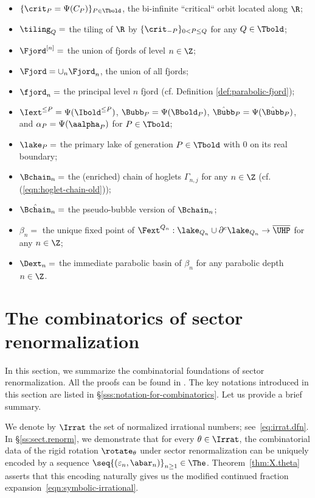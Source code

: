 \documentclass{amsart}
\begin{document}
\begin{itemize}
    \item $\{ \crit_P = \Psi(C_P) \}_{P \in \Tbold}$, the bi-infinite ``critical`` orbit located along $\R$;
    \item $\tiling_Q =$ the tiling of $\R$ by $\{\crit_{-P}\}_{0 < P \leq Q}$ for any $Q \in \Tbold$;
    \item $\Fjord^{[n]} = $ the union of fjords of level $n \in \Z$;
    \item $\Fjord = \cup_n \Fjord_n$, the union of all fjords;
    \item $\fjord_n = $ the principal level $n$ fjord (cf. Definition \ref{def:parabolic-fjord});
    \item $\Iext^{\leq P} = \Psi(\Ibold^{\leq P})$, $\Bubb_P = \Psi(\Bbold_P)$, $\hat{\Bubb}_P = \Psi(\hat{\Bubb}_P)$, and $\alpha_P = \Psi(\aalpha_P)$ for $P \in \Tbold$;
    \item $\lake_P = $ the primary lake of generation $P \in \Tbold$ with $0$ on its real boundary;
    \item $\Bchain_n =$ the (enriched) chain of hoglets $\Gamma_{n,j}$ for any $n \in \Z$ (cf. (\ref{eqn:hoglet-chain-old}));
    \item $\hat{\Bchain}_n =$ the pseudo-bubble version of $\Bchain_n$;
    \item $\beta_n =$ the unique fixed point of $\Fext^{Q_n}: \lake_{Q_n} \cup \partial^c \lake_{Q_n} \to \overline{\UHP}$ for any $n \in \Z$;
    \item $\Dext_n =$ the immediate parabolic basin of $\beta_n$ for any parabolic depth $n \in \Z$.
\end{itemize}


\section{The combinatorics of sector renormalization}
\label{sec:combinatorics}

In this section, we summarize the combinatorial foundations of sector renormalization. All the proofs can be found in \cite{Lim26a}. The key notations introduced in this section are listed in \S\ref{sss:notation-for-combinatorics}. Let us provide a brief summary.

We denote by $\Irrat$ the set of normalized irrational numbers; see~\eqref{eq:irrat.dfn}. 
In \S\ref{ss:sect.renorm}, we demonstrate that for every $\theta\in \Irrat$, the combinatorial data of the rigid rotation $\rotate_\theta$ under sector renormalization can be uniquely encoded by a sequence $\seq{ (\varepsilon_n, \abar_n) }_{n\geq 1}\in \The$. Theorem~\ref{thm:X.theta} asserts that this encoding naturally gives us the modified continued fraction expansion~\eqref{eqn:symbolic-irrational}.
\end{document}
